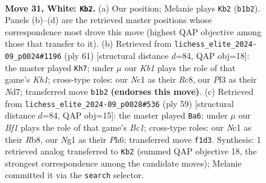 \documentclass[11pt]{article}
\begin{document}
\clearpage

\begin{figure}[p]\centering
\begin{subfigure}{0.46\textwidth}\centering
\resizebox{\linewidth}{!}{%
\newchessgame
\chessboard[
  setfen={1r3k2/4rP2/ppn5/2p1pbp1/P7/2P2P2/6PP/1KN1RBNR w - - 0 31},
  showmover=false,
  pgfstyle=straightmove, color=movearrow, markmove={b1-b2}
]}
\caption{}
\end{subfigure}\hfill
\begin{subfigure}{0.46\textwidth}\centering
\resizebox{\linewidth}{!}{%
\newchessgame
\chessboard[
  setfen={2r4k/3n2p1/2pprbpp/8/3BPP2/2N3P1/1PP1R1K1/3R4 b - - 3 31},
  showmover=false,
  pgfstyle=straightmove, color=movearrow, markmove={h8-h7}
]}
\caption{}
\end{subfigure}
\\[4pt]
\begin{subfigure}{0.46\textwidth}\centering
\resizebox{\linewidth}{!}{%
\newchessgame
\chessboard[
  setfen={1rb5/2r1kp2/1N2p2p/ppP1n1p1/4P3/PB2KP2/2R3PP/2R5 b - - 0 30},
  showmover=false,
  pgfstyle=straightmove, color=movearrow, markmove={c8-a6}
]}
\caption{}
\end{subfigure}\hfill

\caption{\textbf{Move 31, White: \texttt{Kb2}.} (a) Our position; Melanie plays \texttt{Kb2} (\texttt{b1b2}). Panels (b)--(d) are the retrieved master positions whose correspondence most drove this move (highest QAP objective among those that transfer to it). (b) Retrieved from \texttt{lichess\_elite\_2024-09\_p0024\#1196} (ply 61) [structural distance $d$=84, QAP obj=18]: the master played \texttt{Kh7}; under $\mu$ our \emph{Kb1} plays the role of that game's \emph{Kh1}; cross-type roles: our \emph{N}c1 as their \emph{R}c8, our \emph{P}f3 as their \emph{N}d7; transferred move \texttt{b1b2} \textbf{(endorses this move)}. (c) Retrieved from \texttt{lichess\_elite\_2024-09\_p0028\#536} (ply 59) [structural distance $d$=84, QAP obj=15]: the master played \texttt{Ba6}; under $\mu$ our \emph{Bf1} plays the role of that game's \emph{Bc1}; cross-type roles: our \emph{N}c1 as their \emph{R}b8, our \emph{N}g1 as their \emph{P}h6; transferred move \texttt{f1d3}. Synthesis: 1 retrieved analog transferred to \texttt{Kb2} (summed QAP objective 18, the strongest correspondence among the candidate moves); Melanie committed it via the \texttt{search} selector.}
\label{fig:thought-m60}
\end{figure}

\clearpage
\end{document}

